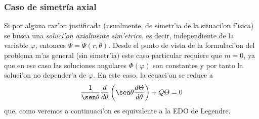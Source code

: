 \subsubsection{Caso de simetr\'ia axial}
Si por alguna raz'on justificada (usualmente, de simetr'ia de la situaci'on f'isica) se busca una \textit{soluci'on axialmente sim'etrica}, es decir, independiente de la variable $\varphi$, entonces $\Psi=\Psi(r,\theta)$. Desde el punto de vista de la formulaci'on del problema m'as general (sin simetr'ia) este caso particular requiere que $m=0$, ya que en ese caso las soluciones angulares $\Phi(\varphi)$ son constantes y por tanto la soluci'on no depender'a de $\varphi$. En este caso, la ecuaci'on se reduce a
\begin{equation}
\frac{1}{\sen\theta}\frac{d}{d\theta}\left(\sen\theta\frac{d\Theta}{d\theta}\right)
+Q\Theta = 0
\end{equation}
que, como veremos a continuaci'on es equivalente a la EDO de Legendre.